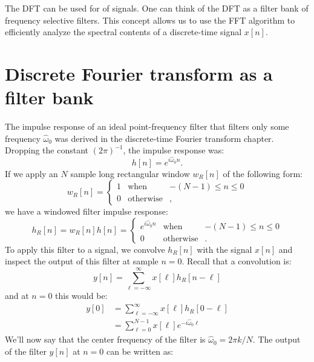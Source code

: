 The DFT can be used for  of signals. One can think of
the DFT as a filter bank of frequency selective filters. This concept
allows us to use the FFT algorithm to efficiently analyze the spectral
contents of a discrete-time signal $x[n]$.

\section{Discrete Fourier transform as a filter bank}

The impulse response of an ideal point-frequency filter that filters
only some frequency $\hat{\omega}_0$ was derived in the discrete-time
Fourier transform chapter. Dropping the constant $(2\pi)^{-1}$, the impulse response was:
\begin{equation}
h[n] = e^{i \hat{\omega}_0 n}.
\end{equation}
If we apply an $N$ sample long rectangular window $w_{R}[n]$ of the following form:
\begin{equation}
w_R[n] =\left\{ \begin{array}{ccc}
1 & \mathrm{when} &-(N-1) \le n \le 0\\
0 & \mathrm{otherwise}&,
\end{array}
\right.
\end{equation}
we have a windowed filter impulse response:
\begin{equation}
h_R[n]=w_R[n]h[n] = \left\{ \begin{array}{ccc}
e^{i \hat{\omega}_0 n} & \mathrm{when} & -(N-1) \le n \le 0\\
0 & \mathrm{otherwise}&.
\end{array}
\right.
\end{equation}
To apply this filter to a signal, we convolve $h_R[n]$ with the signal $x[n]$ and inspect the output of this filter at sample $n=0$. Recall that a convolution is:
\begin{equation}
y[n] = \sum_{\ell=-\infty}^{\infty} x[\ell]h_R[n-\ell]
\end{equation}
and at $n=0$ this would be:
\begin{align}
y[0] &= \sum_{\ell=-\infty}^{\infty} x[\ell]h_R[0-\ell]\\
     &= \sum_{\ell=0}^{N-1} x[\ell]e^{-i \hat{\omega}_0 \ell}
\end{align}
We'll now say that the center frequency of the filter is $\hat{\omega}_0 = 2\pi k/N$. The output of the filter $y[n]$ at $n=0$ can be written as:
